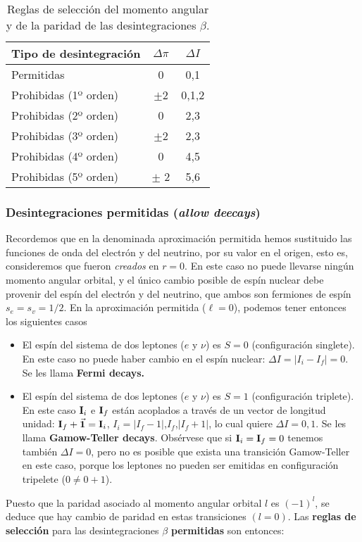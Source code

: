 \begin{table}[h!]\centering
	\begin{tabular}{|l||c|c|}\hline
		Tipo de desintegración & $\Delta \pi$ & $\Delta I$ \\ \hline \hline
		Permitidas & 0 & 0,1 \\ \hline 
		Prohibidas (1º orden) & $\pm$2 & 0,1,2 \\ \hline
		Prohibidas (2º orden) & 0 & 2,3 \\ 	\hline	
		Prohibidas (3º orden) & $\pm$2 & 2,3 \\ \hline	
		Prohibidas (4º orden) & 0 & 4,5 \\ 	\hline	
		Prohibidas (5º orden) & $\pm$ 2 & 5,6  \\		 \hline
	\end{tabular}
	\caption{Reglas de selección del momento angular y de la paridad de las desintegraciones $\beta$.}
	\label{Tab:02-02-01}
\end{table}




\subsubsection{Desintegraciones permitidas (\textit{allow deecays})}


Recordemos que en la denominada aproximación permitida hemos sustituido las funciones de onda del electrón y del neutrino, por su valor en el origen, esto es, consideremos que fueron \textit{creados} en $r=0$. En este caso no puede llevarse ningún momento angular orbital, y el único cambio posible de espín nuclear debe provenir del espín del electrón y del neutrino, que ambos son fermiones de espín $s_e=s_v=1/2$. En la aproximación permitida ($\ell=0$), podemos tener entonces los siguientes casos

\begin{itemize}
	\item El espín del sistema de dos leptones ($e$ y $\nu$) es $S=0$ (configuración singlete). En este caso no puede haber cambio en el espín nuclear: $\Delta I=|I_i-I_f|=0$. Se les llama \textbf{Fermi decays.}
	\item El espín del sistema de dos leptones ($e$ y $\nu$) es $S=1$ (configuración triplete). En este caso $\mathbf{I}_i$ e $\mathbf{I}_f$ están acoplados a través de un vector de longitud unidad: $\mathbf{I}_f + \vec{\mathbf{1}} = \mathbf{I}_i$, $I_i=|I_f-1|$,$I_f$,$|I_f+1|$, lo cual quiere $\Delta I = 0,1$. Se les llama \textbf{Gamow-Teller decays}. Obsérvese que si $\mathbf{I}_i=\mathbf{I}_f=0$ tenemos también $\Delta I=0$, pero no es posible que exista una transición Gamow-Teller en este caso, porque los leptones no pueden ser emitidas en configuración tripelete ($0\neq 0+1$).
\end{itemize}
Puesto que la paridad asociado al momento angular orbital $l$ es $(-1)^l$, se deduce que hay cambio de paridad en estas transiciones $(l=0)$. Las \textbf{reglas de selección} para las desintegraciones $\beta$ \textbf{permitidas} son entonces:

